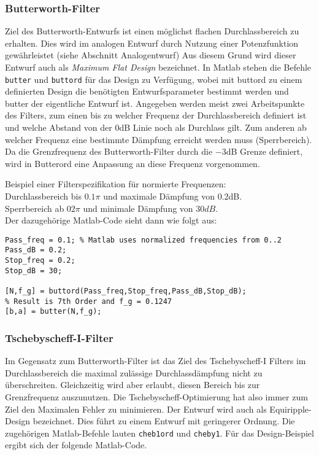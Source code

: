 \subsubsection{Butterworth-Filter}
Ziel des Butterworth-Entwurfs ist einen möglichst flachen Durchlassbereich zu erhalten.
Dies wird im analogen Entwurf durch Nutzung einer Potenzfunktion gewährleistet (siehe Abschnitt Analogentwurf)
Aus diesem Grund wird dieser Entwurf auch als {\em Maximum Flat Design} bezeichnet.
In Matlab stehen die Befehle \verb+butter+ und \verb+buttord+ für das Design zu Verfügung, wobei
mit buttord zu einem definierten Design die benötigten Entwurfsparameter bestimmt werden und
butter der eigentliche Entwurf ist. Angegeben werden meist zwei Arbeitspunkte des Filters, zum einen
bis zu welcher Frequenz der Durchlassbereich definiert ist und welche Abstand von der 0dB Linie noch als
Durchlass gilt. Zum anderen ab welcher Frequenz eine bestimmte Dämpfung erreicht werden muss (Sperrbereich).
Da die Grenzfrequenz des Butterworth-Filter durch die $-3$dB Grenze definiert, wird in Butterord eine
Anpassung an diese Frequenz vorgenommen.

Beispiel einer Filterspezifikation für normierte Frequenzen:\\
Durchlassbereich bis $0.1\pi$ und maximale Dämpfung von $0.2$dB.\\
Sperrbereich ab $02\pi$ und minimale Dämpfung von $30dB$.\\
Der dazugehörige Matlab-Code sieht dann wie folgt aus:

\begin{verbatim}
Pass_freq = 0.1; % Matlab uses normalized frequencies from 0..2
Pass_dB = 0.2;
Stop_freq = 0.2;
Stop_dB = 30;

[N,f_g] = buttord(Pass_freq,Stop_freq,Pass_dB,Stop_dB);
% Result is 7th Order and f_g = 0.1247
[b,a] = butter(N,f_g);
\end{verbatim}

\subsubsection{Tschebyscheff-I-Filter}
Im Gegensatz zum Butterworth-Filter ist das Ziel des Tschebyscheff-I Filters
im Durchlassbereich die maximal zulässige Durchlassdämpfung nicht zu überschreiten. Gleichzeitig
wird aber erlaubt, diesen Bereich bis zur Grenzfrequenz auszunutzen. Die Tschebyscheff-Optimierung
hat also immer zum Ziel den Maximalen Fehler zu minimieren. Der Entwurf wird
auch als Equiripple-Design bezeichnet.
Dies führt zu einem Entwurf mit geringerer Ordnung. Die zugehörigen Matlab-Befehle lauten
\verb+cheb1ord+ und \verb+cheby1+. Für das Design-Beispiel ergibt sich der folgende
Matlab-Code.

